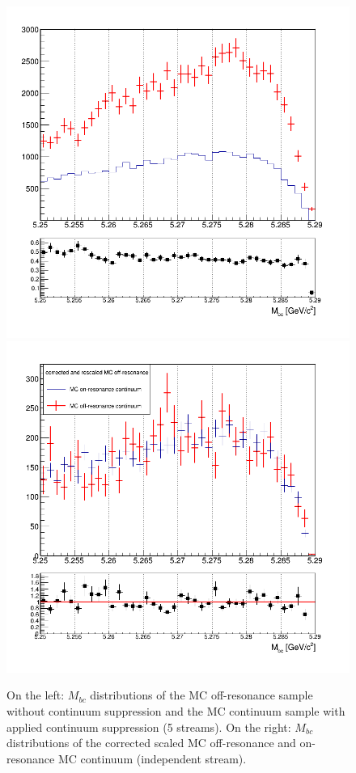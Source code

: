 \begin{figure}[H]
\centering
\subcaptionbox{\label{fig:stream02345_charged_anticorrLambdaC_woCScuts_Mbc_scaling}}
{\includegraphics[width=.45\textwidth]{06-chargedAnticorrBtoLambda/figs/stream02345_charged_anticorrLambdaC_woCScuts_Mbc_scaling.png}} \quad
\subcaptionbox{\label{fig:MC_on_off_resonance_stream2_anticorrLambda_continuum_2D_Mbc_corrected}}
{\includegraphics[width=.45\textwidth]{06-chargedAnticorrBtoLambda/figs/MC_on_off_resonance_stream2_anticorrLambda_continuum_2D_Mbc_corrected.png}} \quad
\caption{On the left: $M_{bc}$ distributions of the MC off-resonance sample without continuum suppression and the MC continuum sample with applied continuum suppression (5 streams). On the right: $M_{bc}$ distributions of the corrected scaled MC off-resonance and on-resonance MC continuum (independent stream).}
\end{figure}


